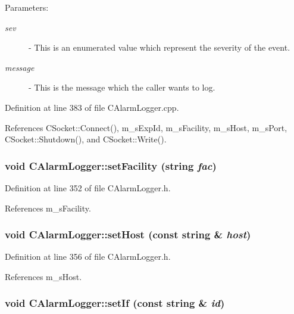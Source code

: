 \begin{Desc}
\item[Parameters: ]\par
\begin{description}
\item[{\em 
sev}]- This is an enumerated value which represent the severity of the event. \item[{\em 
message}]- This is the message which the caller wants to log. \end{description}
\end{Desc}


Definition at line 383 of file CAlarm\-Logger.cpp.

References CSocket::Connect(), m\_\-s\-Exp\-Id, m\_\-s\-Facility, m\_\-s\-Host, m\_\-s\-Port, CSocket::Shutdown(), and CSocket::Write().
\subsubsection{\setlength{\rightskip}{0pt plus 5cm}void CAlarm\-Logger::set\-Facility (string {\em fac})\hspace{0.3cm}{\tt  [inline, protected]}}\label{classCAlarmLogger_b0}




Definition at line 352 of file CAlarm\-Logger.h.

References m\_\-s\-Facility.
\subsubsection{\setlength{\rightskip}{0pt plus 5cm}void CAlarm\-Logger::set\-Host (const string \& {\em host})\hspace{0.3cm}{\tt  [inline, protected]}}\label{classCAlarmLogger_b1}




Definition at line 356 of file CAlarm\-Logger.h.

References m\_\-s\-Host.
\subsubsection{\setlength{\rightskip}{0pt plus 5cm}void CAlarm\-Logger::set\-If (const string \& {\em id})\hspace{0.3cm}{\tt  [inline, protected]}}\label{classCAlarmLogger_b3}




